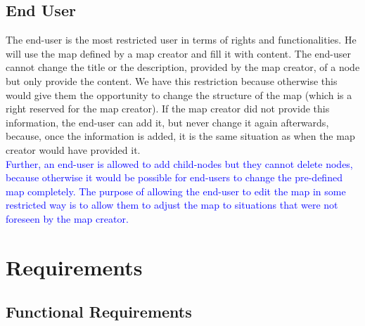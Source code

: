 \subsection{End User}\label{sec:user-class-end-user}
The end-user is the most restricted user in terms of rights and functionalities. He will use the map defined by a map creator and fill it with content. The end-user cannot change the title or the description, provided by the map creator, of a node but only provide the content. We have this restriction because otherwise this would give them the opportunity to change the structure of the map (which is a right reserved for the map creator). If the map creator did not provide this information, the end-user can add it, but never change it again afterwards, because, once the information is added, it is the same situation as when the map creator would have provided it.\\

\textcolor{blue}{
Further, an end-user is allowed to add child-nodes but they cannot delete nodes, because otherwise it would be possible for end-users to change the pre-defined map completely. The purpose of allowing the end-user to edit the map in some restricted way is to allow them to adjust the map to situations that were not foreseen by the map creator.
}


\color{blue}
\section{Requirements}\label{sec:requirements}

\subsection{Functional Requirements}\label{sec:functional-requirements}

